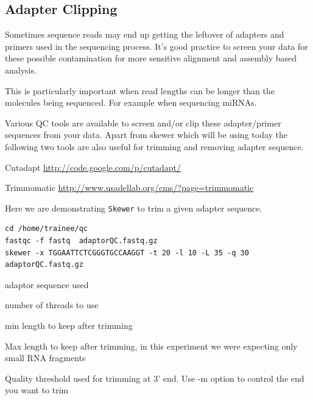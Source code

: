 \begin{advanced}
\subsection{Adapter Clipping}
Sometimes sequence reads may end up getting the leftover of adapters and primers
used in the sequencing process. It's good practice to screen your data for
these possible contamination for more sensitive alignment and assembly based
analysis.

\begin{note}
This is particularly important when read lengths can be longer than the
molecules being sequenced. For example when sequencing miRNAs.
\end{note}

Various QC tools are available to screen and/or clip these adapter/primer
sequences from your data. Apart from skewer which will be using today the 
following two tools are also useful for trimming and removing adapter sequence.

Cutadapt 
\url{http://code.google.com/p/cutadapt/}

Trimmomatic 
\url{http://www.usadellab.org/cms/?page=trimmomatic}

\begin{steps}
Here we are demonstrating \texttt{Skewer} to trim a given adapter
sequence.

\begin{lstlisting}
cd /home/trainee/qc
fastqc -f fastq  adaptorQC.fastq.gz
skewer -x TGGAATTCTCGGGTGCCAAGGT -t 20 -l 10 -L 35 -q 30 adaptorQC.fastq.gz
\end{lstlisting}
\end{steps}

\begin{note}
\begin{description}[style=multiline,labelindent=0cm,align=right,leftmargin=\descriptionlabelspace,rightmargin=1.5cm,font=\ttfamily]
\item[-x] adaptor sequence used
\item[-t] number of threads to use
\item[-l] min length to keep after trimming
\item[-L] Max length to keep after trimming, in this experiment we were expecting only small RNA fragments
\item[-Q] Quality threshold used for trimming at 3' end. Use -m option to control the end you want to trim
\end{description}
\end{note}


\end{advanced}
